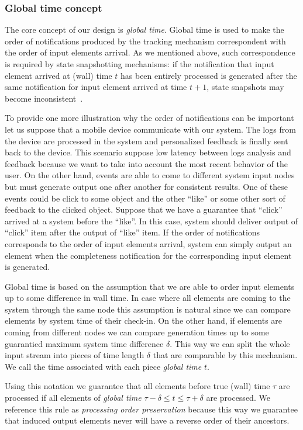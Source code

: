 \subsubsection{Global time concept} \label{fs-acker-gt}
The core concept of our design is \textit{global time}. Global time is used to make the order of notifications produced by the tracking mechanism correspondent with the order of input elements arrival. As we mentioned above, such correspondence is required by state snapshotting mechanisms: if the notification that input element arrived at (wall) time $t$ has been entirely processed is generated after the same notification for input element arrived at time $t+1$, state snapshots may become inconsistent~\cite{2015arXiv150608603C}.

To provide one more illustration why the order of notifications can be important let us suppose that a mobile device communicate with our system. The logs from the device are processed in the system and personalized feedback is finally sent back to the device. This scenario suppose low latency between logs analysis and feedback because we want to take into account the most recent behavior of the user. On the other hand, events are able to come to different system input nodes but must generate output one after another for consistent results. One of these events could be click to some object and the other ``like'' or some other sort of feedback to the clicked object. Suppose that we have a guarantee that ``click'' arrived at a system before the ``like''. In this case, system should deliver output of ``click'' item after the output of ``like'' item. If the order of notifications corresponds to the order of input elements arrival, system can simply output an element when the completeness notification for the corresponding input element is generated.

Global time is based on the assumption that we are able to order input elements up to some difference in wall time. In case where all elements are coming to the system through the same node this assumption is natural since we can compare elements by system time of their check-in. On the other hand, if elements are coming from different nodes we can compare generation times up to some guarantied maximum system time difference $\delta$. This way we can split the whole input stream into pieces of time length $\delta$ that are comparable by this mechanism. We call the time associated with each piece \textit{global time} $t$.

Using this notation we guarantee that all elements before true (wall) time $\tau$ are processed if all elements of \textit{global time} $\tau - \delta \le t \le \tau + \delta$ are processed. We reference this rule as \textit{processing order preservation} because this way we guarantee that induced output elements never will have a reverse order of their ancestors.

